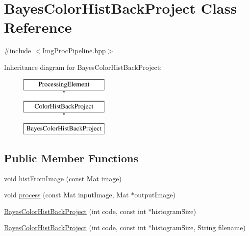 \hypertarget{classBayesColorHistBackProject}{\section{\-Bayes\-Color\-Hist\-Back\-Project \-Class \-Reference}
\label{classBayesColorHistBackProject}
}


{\ttfamily \#include $<$\-Img\-Proc\-Pipeline.\-hpp$>$}

\-Inheritance diagram for \-Bayes\-Color\-Hist\-Back\-Project\-:\begin{figure}[H]
\begin{center}
\leavevmode
\includegraphics[height=3.000000cm]{classBayesColorHistBackProject}
\end{center}
\end{figure}
\subsection*{\-Public \-Member \-Functions}
\begin{DoxyCompactItemize}
\item 
void \hyperlink{classBayesColorHistBackProject_a65a2a0df392e5d905cb04cb1ada83b9f}{hist\-From\-Image} (const \-Mat image)
\item 
void \hyperlink{classBayesColorHistBackProject_aa191428914b3257f2a0945ba090f6d22}{process} (const \-Mat input\-Image, \-Mat $\ast$output\-Image)
\item 
\hyperlink{classBayesColorHistBackProject_a6adedcb9ddad62ea3449d24cf4bc1c9c}{\-Bayes\-Color\-Hist\-Back\-Project} (int code, const int $\ast$histogram\-Size)
\item 
\hyperlink{classBayesColorHistBackProject_a062355e108f3e948ab6d65ad67c84bed}{\-Bayes\-Color\-Hist\-Back\-Project} (int code, const int $\ast$histogram\-Size, \-String filename)
\end{DoxyCompactItemize}


